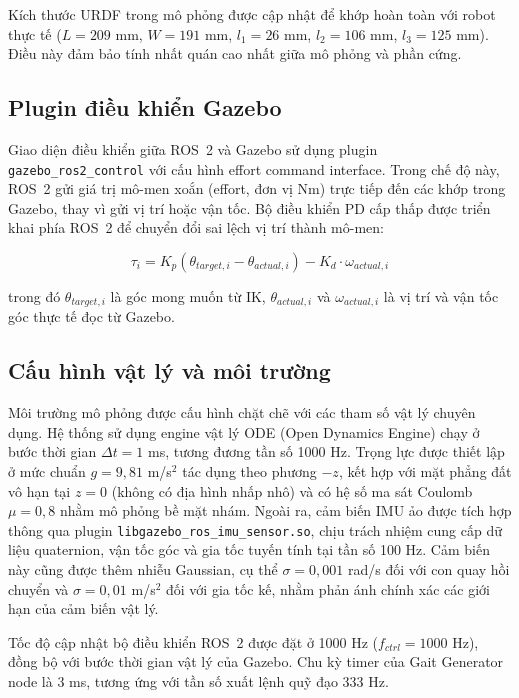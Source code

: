 Kích thước URDF trong mô phỏng được cập nhật để khớp hoàn toàn với robot thực tế ($L=209$ mm, $W=191$ mm, $l_1=26$ mm, $l_2=106$ mm, $l_3=125$ mm). Điều này đảm bảo tính nhất quán cao nhất giữa mô phỏng và phần cứng.

\subsection{Plugin điều khiển Gazebo}

Giao diện điều khiển giữa ROS~2 và Gazebo sử dụng plugin \texttt{gazebo\_ros2\_control} với cấu hình effort command interface. Trong chế độ này, ROS~2 gửi giá trị mô-men xoắn (effort, đơn vị Nm) trực tiếp đến các khớp trong Gazebo, thay vì gửi vị trí hoặc vận tốc. Bộ điều khiển PD cấp thấp được triển khai phía ROS~2 để chuyển đổi sai lệch vị trí thành mô-men:

\begin{equation}
    \tau_i = K_p (\theta_{target,i} - \theta_{actual,i}) - K_d \cdot \omega_{actual,i}
\end{equation}

trong đó $\theta_{target,i}$ là góc mong muốn từ IK, $\theta_{actual,i}$ và $\omega_{actual,i}$ là vị trí và vận tốc góc thực tế đọc từ Gazebo.

\subsection{Cấu hình vật lý và môi trường}

Môi trường mô phỏng được cấu hình chặt chẽ với các tham số vật lý chuyên dụng. Hệ thống sử dụng engine vật lý ODE (Open Dynamics Engine) chạy ở bước thời gian $\Delta t = 1$ ms, tương đương tần số 1000 Hz. Trọng lực được thiết lập ở mức chuẩn $g = 9{,}81$ m/s$^2$ tác dụng theo phương $-z$, kết hợp với mặt phẳng đất vô hạn tại $z = 0$ (không có địa hình nhấp nhô) và có hệ số ma sát Coulomb $\mu = 0{,}8$ nhằm mô phỏng bề mặt nhám. Ngoài ra, cảm biến IMU ảo được tích hợp thông qua plugin \texttt{libgazebo\_ros\_imu\_sensor.so}, chịu trách nhiệm cung cấp dữ liệu quaternion, vận tốc góc và gia tốc tuyến tính tại tần số 100 Hz. Cảm biến này cũng được thêm nhiễu Gaussian, cụ thể $\sigma = 0{,}001$ rad/s đối với con quay hồi chuyển và $\sigma = 0{,}01$ m/s$^2$ đối với gia tốc kế, nhằm phản ánh chính xác các giới hạn của cảm biến vật lý.

Tốc độ cập nhật bộ điều khiển ROS~2 được đặt ở 1000 Hz ($f_{ctrl} = 1000$ Hz), đồng bộ với bước thời gian vật lý của Gazebo. Chu kỳ timer của Gait Generator node là 3 ms, tương ứng với tần số xuất lệnh quỹ đạo 333 Hz.

